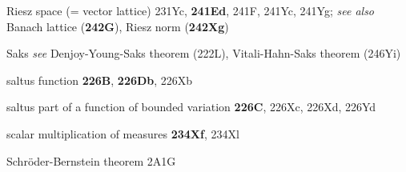 Riesz space (= vector lattice) 231Yc, {\bf 241Ed}, 241F,
241Yc, 241Yg; 
  {\it see also}
Banach lattice ({\bf 242G}),
Riesz norm ({\bf 242Xg})





















































\indexmedskip

Saks {\it see} Denjoy-Young-Saks theorem (222L),
Vitali-Hahn-Saks theorem (246Yi)






saltus function {\bf 226B}, {\bf 226Db}, 226Xb


saltus part of a function of bounded variation {\bf 226C},
226Xc, 226Xd, 226Yd




















scalar multiplication of measures {\bf 234Xf}, 234Xl












Schr\"oder-Bernstein theorem 2A1G


